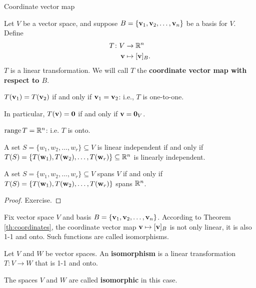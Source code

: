 \begin{frame}{Coordinate vector map}
\begin{theorem}\label{th:coordinates}
Let $V$ be a vector space, and suppose $B=\{{\mathbf v}_1,{\mathbf v}_2,\dots, {\mathbf v}_n\}$ be a basis for $V$. Define 
\begin{align*}
T\colon V&\rightarrow {\mathbb R}^n\\
{\mathbf v}&\mapsto [{\mathbf v}]_B.
\end{align*}
\bb
\ii  $T$ is a linear transformation. We will call $T$ the {\bf coordinate vector map with respect to $B$}.

\ii $T({\mathbf v}_1)=T({\mathbf v}_2)$ if and only if ${\mathbf v}_1={\mathbf v}_2$: i.e., $T$ is \alert{one-to-one}. 

In particular, $T({\mathbf v})={\mathbf 0}$ if and only if ${\mathbf v}={\mathbf 0}_V$. 

\ii  $\operatorname{range} T={\mathbb R}^n$: i.e. $T$ is \alert{onto}. 

\ii  A set $S=\{w_1,w_2,\dots, w_r\}\subseteq V$ is linear independent  if and only if $T(S)=\{T({\mathbf w}_1), T({\mathbf w}_2),\dots, T({\mathbf w}_r)\}\subseteq {\mathbb R}^n$ is linearly independent. 

\ii A set $S=\{w_1,w_2,\dots, w_r\}\subseteq V$ spans $V$ if and only if $T(S)=\{T({\mathbf w}_1), T({\mathbf w}_2),\dots, T({\mathbf w}_r)\}$ spans ${\mathbb R}^n$. 
\ee
\end{theorem}
 \begin{proof}
 Exercise.
 \end{proof}
\end{frame}
\begin{frame}
Fix vector space $V$ and basis $B=\{{\mathbf v}_1,{\mathbf v}_2,\dots, {\mathbf v}_n\}$. According to Theorem \ref{th:coordinates}, the coordinate vector map ${\mathbf v}\mapsto [{\mathbf v}]_B$ is not only \alert{linear}, it is also \alert{1-1 and onto}.  Such functions are called \alert{isomorphisms}.  
\pause
\begin{definition}
Let $V$ and $W$ be vector spaces. An {\bf isomorphism} is a linear transformation $T\colon V\rightarrow W$ that is 1-1 and onto. 

The spaces $V$ and $W$ are called {\bf isomorphic} in this case. 
\end{definition}
\pause
\begin{comment}
`Isomorphism' is derived from the Greek terms `isos', meaning ``equal", and `morphe', meaning ``form". 
\bspace
We do not have time in the course to study isomorphisms in detail. Instead we content ourselves with the following \alert{general principle}:  when $V$ and $W$ are isomorphic, as witnessed by an isomorphism $T\colon V\rightarrow W$, the spaces are identical as far as vector space structure is concerned, even though as sets they may look completely different. 
\bpause
Furthermore, since $T$ is 1-1 and onto, it has an inverse function $T^{-1}\colon W\rightarrow V$. Furthermore, you can show that $T^{-1}$ is also a linear transformation. The two functions $T$ and $T^{-1}$ allow us to to go back and forth between $V$ and $W$, translating statements about $V$ into corresponding statements about $W$ with no information loss. 
\end{comment}
\end{frame}
